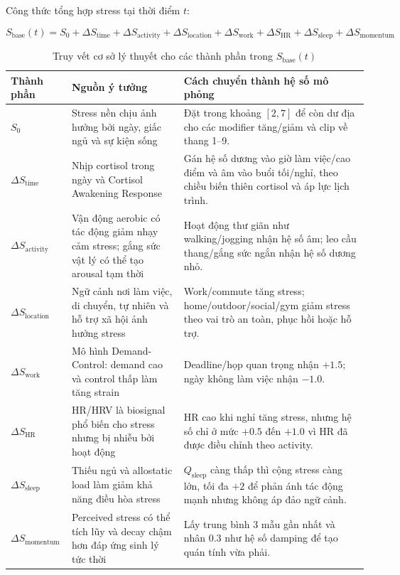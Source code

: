 Công thức tổng hợp stress tại thời điểm $t$:

\begin{equation}
\label{eq:base_stress}
    S_{\text{base}}(t) = S_0 + \Delta S_{\text{time}} + \Delta S_{\text{activity}} + \Delta S_{\text{location}} + \Delta S_{\text{work}} + \Delta S_{\text{HR}} + \Delta S_{\text{sleep}} + \Delta S_{\text{momentum}}
\end{equation}

\begin{table}[H]
\centering
\caption{Truy vết cơ sở lý thuyết cho các thành phần trong $S_{\text{base}}(t)$}
\label{tab:stress_formula_traceability}
\small
\begin{tabular}{|l|p{4.2cm}|p{6.0cm}|}
\hline
\textbf{Thành phần} & \textbf{Nguồn ý tưởng} & \textbf{Cách chuyển thành hệ số mô phỏng} \\
\hline
$S_0$ & Stress nền chịu ảnh hưởng bởi ngày, giấc ngủ và sự kiện sống & Đặt trong khoảng $[2,7]$ để còn dư địa cho các modifier tăng/giảm và clip về thang 1--9. \\
\hline
$\Delta S_{\text{time}}$ & Nhịp cortisol trong ngày và Cortisol Awakening Response \cite{chrousos2009stress} & Gán hệ số dương vào giờ làm việc/cao điểm và âm vào buổi tối/nghỉ, theo chiều biến thiên cortisol và áp lực lịch trình. \\
\hline
$\Delta S_{\text{activity}}$ & Vận động aerobic có tác động giảm nhạy cảm stress; gắng sức vật lý có thể tạo arousal tạm thời \cite{salmon2001effects} & Hoạt động thư giãn như walking/jogging nhận hệ số âm; leo cầu thang/gắng sức ngắn nhận hệ số dương nhỏ. \\
\hline
$\Delta S_{\text{location}}$ & Ngữ cảnh nơi làm việc, di chuyển, tự nhiên và hỗ trợ xã hội ảnh hưởng stress \cite{karasek1979job, bratman2015nature} & Work/commute tăng stress; home/outdoor/social/gym giảm stress theo vai trò an toàn, phục hồi hoặc hỗ trợ. \\
\hline
$\Delta S_{\text{work}}$ & Mô hình Demand-Control: demand cao và control thấp làm tăng strain \cite{karasek1979job} & Deadline/họp quan trọng nhận $+1.5$; ngày không làm việc nhận $-1.0$. \\
\hline
$\Delta S_{\text{HR}}$ & HR/HRV là biosignal phổ biến cho stress nhưng bị nhiễu bởi hoạt động \cite{hovsepian2015cstress, giannakakis2019review} & HR cao khi nghỉ tăng stress, nhưng hệ số chỉ ở mức $+0.5$ đến $+1.0$ vì HR đã được điều chỉnh theo activity. \\
\hline
$\Delta S_{\text{sleep}}$ & Thiếu ngủ và allostatic load làm giảm khả năng điều hòa stress \cite{mcewen2008central} & $Q_{\text{sleep}}$ càng thấp thì cộng stress càng lớn, tối đa $+2$ để phản ánh tác động mạnh nhưng không áp đảo ngữ cảnh. \\
\hline
$\Delta S_{\text{momentum}}$ & Perceived stress có thể tích lũy và decay chậm hơn đáp ứng sinh lý tức thời \cite{plarre2011continuous} & Lấy trung bình 3 mẫu gần nhất và nhân $0.3$ như hệ số damping để tạo quán tính vừa phải. \\
\hline
\end{tabular}
\end{table}

